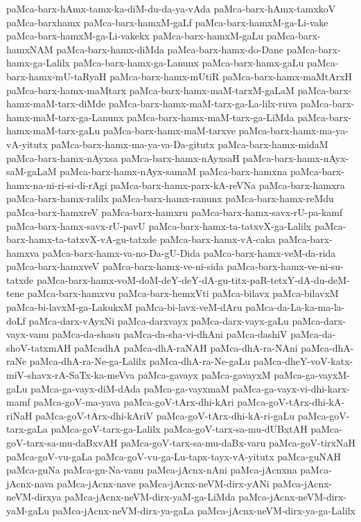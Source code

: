 {paMca-barx-hAmx-tamx-ka-diM-du-da-ya-vAda
paMca-barx-hAmx-tamxkoV
paMca-barxhamx
paMca-barx-hamxM-gaLf
paMca-barx-hamxM-ga-Li-vake
paMca-barx-hamxM-ga-Li-vakekx
paMca-barx-hamxM-gaLu
paMca-barx-hamxNAM
paMca-barx-hamx-diMda
paMca-barx-hamx-do-Dane
paMca-barx-hamx-ga-Lalilx
paMca-barx-hamx-ga-Lanunx
paMca-barx-hamx-gaLu
paMca-barx-hamx-mU-taRyaH
paMca-barx-hamx-mUtiR
paMca-barx-hamx-maMtArxH
paMca-barx-hamx-maMtarx
paMca-barx-hamx-maM-tarxM-gaLaM
paMca-barx-hamx-maM-tarx-diMde
paMca-barx-hamx-maM-tarx-ga-La-lilx-ruva
paMca-barx-hamx-maM-tarx-ga-Lanunx
paMca-barx-hamx-maM-tarx-ga-LiMda
paMca-barx-hamx-maM-tarx-gaLu
paMca-barx-hamx-maM-tarxve
paMca-barx-hamx-ma-ya-vA-yitutx
paMca-barx-hamx-ma-ya-va-Da-gitutx
paMca-barx-hamx-midaM
paMca-barx-hamx-nAyxsa
paMca-barx-hamx-nAyxsaH
paMca-barx-hamx-nAyx-saM-gaLaM
paMca-barx-hamx-nAyx-samaM
paMca-barx-hamxna
paMca-barx-hamx-na-ni-ri-si-di-rAgi
paMca-barx-hamx-parx-kA-reVNa
paMca-barx-hamxra
paMca-barx-hamx-ralilx
paMca-barx-hamx-ranunx
paMca-barx-hamx-reMdu
paMca-barx-hamxreV
paMca-barx-hamxru
paMca-barx-hamx-savx-rU-pa-kamf
paMca-barx-hamx-savx-rU-pavU
paMca-barx-hamx-ta-tatxvX-ga-Lalilx
paMca-barx-hamx-ta-tatxvX-vA-gu-tatxde
paMca-barx-hamx-vA-caka
paMca-barx-hamxva
paMca-barx-hamx-va-no-Da-gU-Dida
paMca-barx-hamx-veM-da-rida
paMca-barx-hamxveV
paMca-barx-hamx-ve-ni-sida
paMca-barx-hamx-ve-ni-su-tatxde
paMca-barx-hamx-voM-doM-deY-deY-dA-gu-titx-paR-tetxY-dA-du-deM-tene
paMca-barx-hamxvu
paMca-barx-hemxVti
paMca-bilavx
paMca-bilavxM
paMca-bi-lavxM-ga-LakukxM
paMca-bi-lavx-veM-dAru
paMca-da-La-ka-ma-la-doLf
paMca-darx-vAyxNi
paMca-darxvayx
paMca-darx-vayx-gaLu
paMca-darx-vayx-vanu
paMca-da-shasu
paMca-da-sha-vi-dhAni
paMca-dashiV
paMca-da-shoV-tatxmAH
paMcadhA
paMca-dhA-raNAH
paMca-dhA-ra-NAni
paMca-dhA-raNe
paMca-dhA-ra-Ne-ga-Lalilx
paMca-dhA-ra-Ne-gaLu
paMca-dheY-voV-katx-miV-shavx-rA-SaTx-ka-meVva
paMca-gavayx
paMca-gavayxM
paMca-ga-vayxM-gaLu
paMca-ga-vayx-diM-dAda
paMca-ga-vayxmaM
paMca-ga-vayx-vi-dhi-karx-mamf
paMca-goV-ma-yava
paMca-goV-tArx-dhi-kAri
paMca-goV-tArx-dhi-kA-riNaH
paMca-goV-tArx-dhi-kAriV
paMca-goV-tArx-dhi-kA-ri-gaLu
paMca-goV-tarx-gaLa
paMca-goV-tarx-ga-Lalilx
paMca-goV-tarx-sa-mu-dUBxtAH
paMca-goV-tarx-sa-mu-daBxvAH
paMca-goV-tarx-sa-mu-daBx-varu
paMca-goV-tirxNaH
paMca-goV-vu-gaLa
paMca-goV-vu-ga-Lu-tapx-tayx-vA-yitutx
paMca-guNAH
paMca-guNa
paMca-gu-Na-vanu
paMca-jAcnx-nAni
paMca-jAcnxna
paMca-jAcnx-nava
paMca-jAcnx-nave
paMca-jAcnx-neVM-dirx-yANi
paMca-jAcnx-neVM-dirxya
paMca-jAcnx-neVM-dirx-yaM-ga-LiMda
paMca-jAcnx-neVM-dirx-yaM-gaLu
paMca-jAcnx-neVM-dirx-ya-gaLa
paMca-jAcnx-neVM-dirx-ya-ga-Lalilx
}
